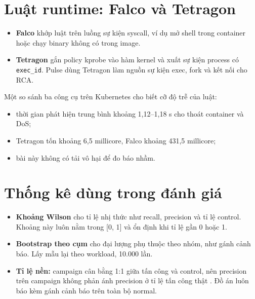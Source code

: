\section{Luật runtime: Falco và Tetragon}

\begin{itemize}
\tightlist
\item
  \textbf{Falco} khớp luật trên luồng sự kiện syscall, ví dụ mở shell trong container hoặc chạy binary không có trong image.
\item
  \textbf{Tetragon} gắn policy kprobe vào hàm kernel và xuất sự kiện process có \texttt{exec\_\allowbreak{}id}. Pulse dùng Tetragon làm nguồn sự kiện exec, fork và kết nối cho RCA.
\end{itemize}

Một so sánh ba công cụ trên Kubernetes \citep{syairozi2025} cho biết cỡ độ trễ của luật:

\begin{itemize}
\tightlist
\item
  thời gian phát hiện trung bình khoảng 1,12--1,18 s cho thoát container và DoS;
\item
  Tetragon tốn khoảng 6,5 millicore, Falco khoảng 431,5 millicore;
\item
  bài này không có tải vô hại để đo báo nhầm.
\end{itemize}

\section{Thống kê dùng trong đánh giá}

\begin{itemize}
\tightlist
\item
  \textbf{Khoảng Wilson} \citep{wilson1927} cho tỉ lệ nhị thức như recall, precision và tỉ lệ control. Khoảng này luôn nằm trong {[}0, 1{]} và ổn định khi tỉ lệ gần 0 hoặc 1.
\item
  \textbf{Bootstrap theo cụm} \citep{efron1993} cho đại lượng phụ thuộc theo nhóm, như gánh cảnh báo. Lấy mẫu lại theo workload, 10.000 lần.
\item
  \textbf{Tỉ lệ nền:} campaign cân bằng 1:1 giữa tấn công và control, nên precision trên campaign không phản ánh precision ở tỉ lệ tấn công thật \citep{arp2022}. Đồ án luôn báo kèm gánh cảnh báo trên toàn bộ normal.
\end{itemize}
